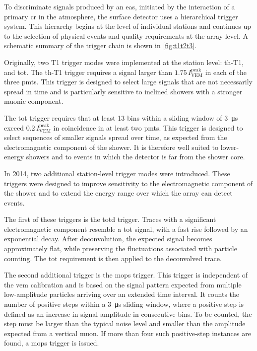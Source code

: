 \documentclass[main.tex]{subfiles}
\begin{document}
To discriminate signals produced by an \gls{eas}, initiated by the interaction of a primary \gls{cr} in the atmosphere, the surface detector uses a hierarchical trigger system.
This hierarchy begins at the level of individual stations and continues up to the selection of physical events and quality requirements at the array level.
A schematic summary of the trigger chain is shown in \cref{fig:t1t2t3}.

Originally, two T1 trigger modes were implemented at the station level: \gls{th}-T1, and \gls{tot}.
The \gls{th}-T1 trigger requires a signal larger than $1.75\,I_{\text{VEM}}^{\text{peak}}$ in each of the three \gls{pmt}s.
This trigger is designed to select large signals that are not necessarily spread in time and is particularly sensitive to inclined showers with a stronger muonic component.

The \gls{tot} trigger requires that at least 13 bins within a sliding window of \SI{3}{\micro\s} exceed $0.2\,I_{\text{VEM}}^{\text{peak}}$ in coincidence in at least two \gls{pmt}s.
This trigger is designed to select sequences of smaller signals spread over time, as expected from the electromagnetic component of the shower.
It is therefore well suited to lower-energy showers and to events in which the detector is far from the shower core.

In 2014, two additional station-level trigger modes were introduced.
These triggers were designed to improve sensitivity to the electromagnetic component of the shower and to extend the energy range over which the array can detect events.

The first of these triggers is the \gls{totd} trigger.
Traces with a significant electromagnetic component resemble a \gls{tot} signal, with a fast rise followed by an exponential decay.
After deconvolution, the expected signal becomes approximately flat, while preserving the fluctuations associated with particle counting.
The \gls{tot} requirement is then applied to the deconvolved trace.

The second additional trigger is the \gls{mops} trigger.
This trigger is independent of the \gls{vem} calibration and is based on the signal pattern expected from multiple low-amplitude particles arriving over an extended time interval.
It counts the number of positive steps within a \SI{3}{\micro\s} sliding window, where a positive step is defined as an increase in signal amplitude in consecutive bins.
To be counted, the step must be larger than the typical noise level and smaller than the amplitude expected from a vertical muon.
If more than four such positive-step instances are found, a \gls{mops} trigger is issued.
\end{document}

